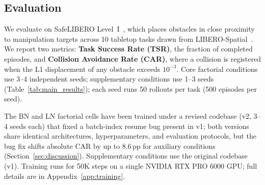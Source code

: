 \subsection{Evaluation}

We evaluate on SafeLIBERO Level~I~\cite{hu2025vlsa}, which places obstacles in close proximity to manipulation targets across 10 tabletop tasks drawn from LIBERO-Spatial~\cite{liu2023libero}. We report two metrics: \textbf{Task Success Rate (TSR)}, the fraction of completed episodes, and \textbf{Collision Avoidance Rate (CAR)}, where a collision is registered when the L1 displacement of any obstacle exceeds $10^{-3}$. Core factorial conditions use 3--4 independent seeds; supplementary conditions use 1--3 seeds (Table~\ref{tab:main_results}); each seed runs 50 rollouts per task (500 episodes per seed).

The BN and LN factorial cells have been trained under a revised codebase (v2, 3--4 seeds each) that fixed a batch-index resume bug present in v1; both versions share identical architectures, hyperparameters, and evaluation protocols, but the bug fix shifts absolute CAR by up to 8.6\,pp for auxiliary conditions (Section~\ref{sec:discussion}). Supplementary conditions use the original codebase (v1). Training runs for 50K steps on a single NVIDIA RTX PRO 6000 GPU; full details are in Appendix~\ref{app:training}.

